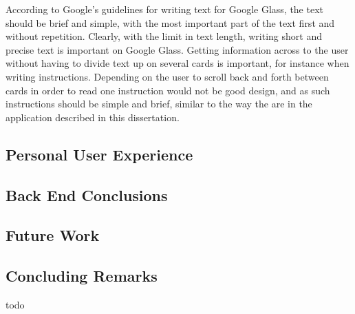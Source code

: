 According to Google's guidelines for writing text for Google Glass, the text should be brief and simple, with the most important part of the text first and without repetition. Clearly, with the limit in text length, writing short and precise text is important on Google Glass. Getting information across to the user without having to divide text up on several cards is important, for instance when writing instructions. Depending on the user to scroll back and forth between cards in order to read one instruction would not be good design, and as such instructions should be simple and brief, similar to the way the are in the application described in this dissertation.

\subsection{Personal User Experience}
\label{subsec:personalexperience}


\subsection{Back End Conclusions}

\subsection{Future Work}
\label{subsec:futurework}


\subsection{Concluding Remarks}
todo
